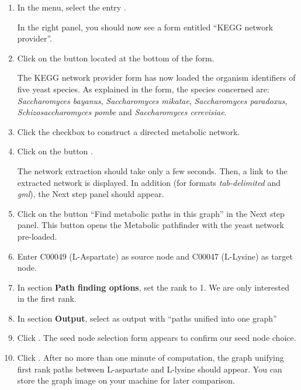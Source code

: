 \begin{enumerate}

\item In the \neat  menu, select the entry .

  In the right panel, you should now see a form entitled
  ``KEGG network provider''.

\item Click on the button  located at the bottom of the form.

  The KEGG network provider form has now loaded the organism identifiers of five yeast species. As explained
  in the form, the species concerned are: \textit{Saccharomyces bayanus}, \textit{Saccharomyces mikatae},
  \textit{Saccharomyces paradoxus}, \textit{Schizosaccharomyces pombe} and \textit{Saccharomyces cerevisiae}.

\item Click the checkbox  to construct a directed metabolic network.

\item Click on the button .

  The network extraction should take only a few seconds.
  Then, a link to the extracted network is displayed.
  In addition (for formats \textit{tab-delimited} and \textit{gml}), the Next step panel should appear.

\item Click on the button ``Find metabolic paths in this graph'' in the Next step panel. This button opens the
Metabolic pathfinder with the yeast network pre-loaded.

\item Enter C00049 (L-Aspartate) as source node and C00047 (L-Lysine) as target node.

\item In section \textbf{Path finding options}, set the rank to 1. We are only interested in the first rank.

\item In section \textbf{Output}, select  as output with ``paths unified into one graph''

\item Click .
  The seed node selection form appears to confirm our seed node choice.

\item Click .
	After no more than one minute of computation, the graph unifying first rank paths between L-aspartate and L-lysine should appear.
	You can store the graph image on your machine for later comparison.

\end{enumerate}


